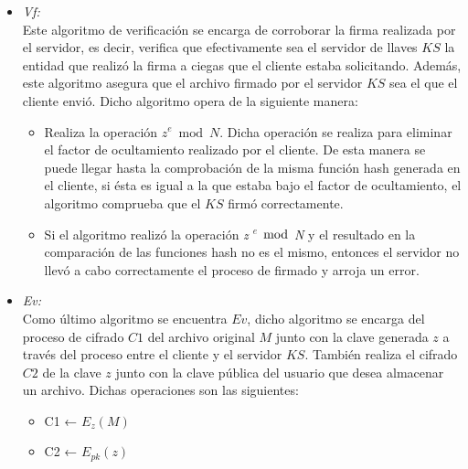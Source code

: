 \begin{itemize}
\item \textit{Vf: }\\

Este algoritmo de verificación se encarga de corroborar la firma realizada por el servidor, es decir, verifica que efectivamente sea el servidor de llaves $KS$ la entidad que realizó la firma a ciegas que el cliente estaba solicitando. Además, este algoritmo asegura que el archivo firmado por el servidor $KS$ sea el que el cliente envió. 
Dicho algoritmo opera de la siguiente manera: 
\begin{itemize}
\item Realiza la operación $z^e \bmod N $. Dicha operación se realiza para eliminar el factor de ocultamiento realizado por el cliente. De esta manera se puede llegar hasta la comprobación de la misma función hash generada en el cliente, si ésta es igual a la que estaba bajo el factor de ocultamiento, el algoritmo comprueba que el $KS$ firmó correctamente. 
\item Si el algoritmo realizó la operación \textit{z $^e$ $\bmod$ N} y el resultado en la comparación de las funciones hash no es el mismo, entonces el servidor no llevó a cabo correctamente el proceso de firmado y arroja un error. 

\end{itemize}

\item \textit{Ev: }\\
Como último algoritmo se encuentra $Ev$, dicho algoritmo se encarga del proceso de cifrado $C1$ del archivo original $M$ junto con la clave generada $z$ a través del proceso entre el cliente y el servidor $KS$. También realiza el cifrado $C2$ de la clave $z$ junto con la clave pública del usuario que desea almacenar un archivo. Dichas operaciones son las siguientes: 

\begin{itemize}
\item C1 ← $E_{z}(M)$
\item C2 ← $E_{pk}(z)$
\end{itemize}



\end{itemize}






